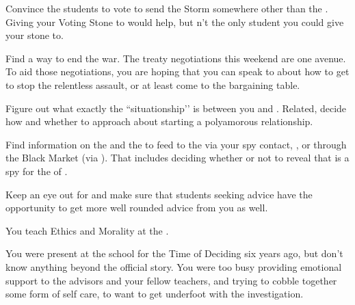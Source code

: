 \documentclass[char]{GL2020}
\begin{document}
\begin{itemz}
    \item Convince the students to vote to send the Storm somewhere other than the \pShip{}. Giving your Voting Stone to \cWarlordDaughter{} would help, but \cWarlordDaughter{\theyare}n’t the only student you could give your stone to.
    \item Find a way to end the war. The treaty negotiations this weekend are one avenue. To aid those negotiations, you are hoping that you can speak to \cWarlordDaughter{} about how to get \cLoud{} to stop the relentless \pShip{} assault, or at least come to the bargaining table.
    \item Figure out what exactly the ``situationship’’ is between you and \cJuniorStatesman{}. Related, decide how and whether to approach \cBeetle{} about starting a polyamorous relationship.
\end{itemz}

\begin{itemz}
    \item Find information on the \pFarm{} and the \pTech{} to feed to the \pShip{} via your spy contact, \cBunker{}, or through the Black Market (via \cLibAssist{}). That includes deciding whether or not to reveal that \cHistory{} is a spy for the \cQueen{\Monarch} of \pFarm{}.
    \item Keep an eye out for \cMusic{} and make sure that students seeking \cMusic{\their} advice have the opportunity to get more well rounded advice from you as well.
\end{itemz}

\begin{itemz}[Notes]
    \item You teach Ethics and Morality at the \pSchool{}.
    \item You were present at the school for the Time of Deciding six years ago, but don't know anything beyond the official story. You were too busy providing emotional support to the advisors and your fellow teachers, and trying to cobble together some form of self care, to want to get underfoot with the investigation.
\end{itemz}
\end{document}
